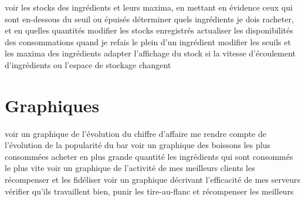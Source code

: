 \documentclass[a4paper,10pt]{article}
\begin{document}
{voir les stocks des ingrédients et leurs maxima, en mettant en évidence ceux qui sont en-dessous du seuil ou épuisés}
{déterminer quels ingrédients je dois racheter, et en quelles quantités}
{modifier les stocks enregistrés}
{actualiser les disponibilités des consommations quand je refais le plein d'un ingrédient}
{modifier les seuils et les maxima des ingrédients}
{adapter l'affichage du stock si la vitesse d'écoulement d'ingrédients ou l'espace de stockage changent}

\section{Graphiques}

{voir un graphique de l'évolution du chiffre d'affaire}
{me rendre compte de l'évolution de la popularité du bar}
{voir un graphique des boissons les plus consommées}
{acheter en plus grande quantité les ingrédients qui sont consommés le plus vite}
{voir un graphique de l'activité de mes meilleurs clients}
{les récompenser et les fidéliser}
{voir un graphique décrivant l'efficacité de mes serveurs}
{vérifier qu'ils travaillent bien, punir les tire-au-flanc et récompenser les meilleurs}
\end{document}
